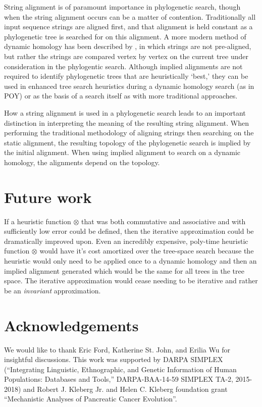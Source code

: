 \documentclass[11pt]{article}
\begin{document}
String alignment is of paramount importance in phylogenetic search, though when the string alignment occurs can be a matter of contention.
Traditionally all input sequence strings are aligned first, and that alignment is held constant as a phylogenetic tree is searched for on this alignment.
A more modern method of dynamic homology has been described by \citep{Wheeler1996}, in which strings are not pre-aligned, but rather the strings are compared vertex by vertex on the current tree under consideration in the phylogentic search.
Although implied alignments are not required to identify phylogenetic trees that are heuristically `best,' they can be used in enhanced tree search heuristics during a dynamic homology search (as in POY) or as the basis of a search itself as with more traditional approaches.

How a string alignment is used in a phylogenetic search leads to an important distinction in interpreting the meaning of the resulting string alignment.
When performing the traditional methodology of aligning strings then searching on the static alignment, the resulting topology of the phylogenetic search is implied by the initial alignment.
When using implied alignment to search on a dynamic homology, the alignments depend on the topology.


\section{Future work}
If a heuristic function $\otimes$ that was both commutative and associative and with sufficiently low error could be defined, then the iterative approximation \citep{Wheeler2003a} could be dramatically improved upon. 
Even an incredibly expensive, poly-time heuristic function $\otimes$ would have it's cost amortized over the tree-space search because the heuristic would only need to be applied once to a dynamic homology and then an implied alignment generated which would be the same for all trees in the tree space. 
The iterative approximation would cease needing to be iterative and rather be an \emph{invariant} approximation.

\section{Acknowledgements}
We would like to thank Eric Ford, Katherine St. John, and Erilia Wu for insightful discussions. This work was supported by DARPA SIMPLEX (``Integrating Linguistic, Ethnographic, and Genetic Information of Human Populations: Databases and Tools,'' DARPA-BAA-14-59 SIMPLEX TA-2, 2015-2018)
 and Robert J. Kleberg Jr. and Helen C. Kleberg foundation grant ``Mechanistic Analyses of Pancreatic Cancer Evolution''.
\end{document}
